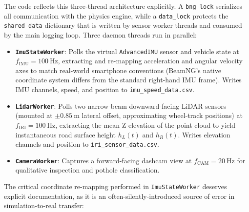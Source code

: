 \documentclass[conference]{IEEEtran}
\begin{document}
The code reflects this three-thread architecture explicitly. A \texttt{bng\_lock} serializes all communication with the physics engine, while a \texttt{data\_lock} protects the \texttt{shared\_data} dictionary that is written by sensor worker threads and consumed by the main logging loop.
Three daemon threads run in parallel:
\begin{itemize}
    \item \textbf{\texttt{ImuStateWorker}}: Polls the virtual \texttt{AdvancedIMU} sensor and vehicle state at $f_{\text{IMU}} = 100~\text{Hz}$, extracting and re-mapping acceleration and angular velocity axes to match real-world smartphone conventions (BeamNG's native coordinate system differs from the standard right-hand IMU frame).
Writes IMU channels, speed, and position to \texttt{imu\_speed\_data.csv}.
    \item \textbf{\texttt{LidarWorker}}: Polls two narrow-beam downward-facing LiDAR sensors (mounted at $\pm 0.85~\text{m}$ lateral offset, approximating wheel-track positions) at $f_{\text{IRI}} = 100~\text{Hz}$, extracting the mean Z-elevation of the point cloud to yield instantaneous road surface height $h_L(t)$ and $h_R(t)$.
Writes elevation channels and position to \texttt{iri\_sensor\_data.csv}.
    \item \textbf{\texttt{CameraWorker}}: Captures a forward-facing dashcam view at $f_{\text{CAM}} = 20~\text{Hz}$ for qualitative inspection and pothole classification.
\end{itemize}

The critical coordinate re-mapping performed in \texttt{ImuStateWorker} deserves explicit documentation, as it is an often-silently-introduced source of error in simulation-to-real transfer:

\begin{table}[htbp]
\centering
\caption{Coordinate Re-mapping from BeamNG to Physical IMU Frame}
\label{tab:imu_mapping}
\end{table}
\end{document}
